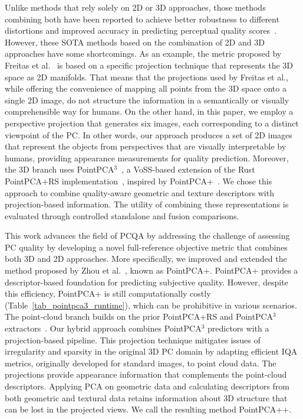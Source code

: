 \documentclass[final,3p,times,twocolumn]{elsarticle}
\begin{document}
Unlike methods that rely solely on 2D or \gls{3D} approaches, those methods combining both have been reported to achieve better robustness to different distortions and improved accuracy in predicting perceptual quality scores~\cite{Javaheri2022joint, freitas2023point, Cui2024Colored}. However, these \gls{SOTA} methods based on the combination of 2D and \gls{3D} approaches have some shortcomings. As an example, the metric proposed by Freitas et al.~\cite{freitas2023point} is based on a specific projection technique that represents the \gls{3D} space as 2D manifolds. That means that the projections used by Freitas et al., while offering the convenience of mapping all points from the \gls{3D} space onto a single 2D image, do not structure the information in a semantically or visually comprehensible way for humans. On the other hand, in this paper, we employ a perspective projection that generates six images, each corresponding to a distinct viewpoint of the \gls{PC}. In other words, our approach produces a set of 2D images that represent the objects from perspectives that are visually interpretable by humans, providing appearance measurements for quality prediction. Moreover, the \gls{3D} branch uses PointPCA$^3$~\cite{carvalho2026pc3}, a \gls{VoSS}-based extension of the Rust PointPCA+RS implementation~\cite{carvalho2025rs}, inspired by PointPCA+~\cite{zhou2025pointpca+}.  We chose this approach to combine quality-aware geometric and texture descriptors with projection-based information. The utility of combining these representations is evaluated through controlled standalone and fusion comparisons.

This work advances the field of \gls{PCQA} by addressing the challenge of assessing \gls{PC} quality by developing a novel full-reference objective metric that combines both \gls{3D} and 2D approaches. More specifically, we improved and extended the method proposed by Zhou et al.~\cite{zhou2023pointpca+, zhou2025pointpca+}, known as PointPCA+. PointPCA+ provides a descriptor-based foundation for predicting subjective quality. However, despite this efficiency, PointPCA+ is still computationally costly (Table~\ref{tab_pointpca3_runtime}), which can be prohibitive in various scenarios. The point-cloud branch builds on the prior PointPCA+RS and PointPCA$^3$ extractors~\cite{carvalho2025rs,carvalho2026pc3}. Our hybrid approach combines PointPCA$^3$ predictors with a projection-based pipeline. This projection technique mitigates issues of irregularity and sparsity in the original \gls{3D} \gls{PC} domain by adapting efficient \gls{IQA} metrics, originally developed for standard images, to point cloud data. The projections provide appearance information that complements the point-cloud descriptors. Applying \gls{PCA} on geometric data and calculating descriptors from both geometric and textural data retains information about \gls{3D} structure that can be lost in the projected views. We call the resulting method PointPCA++.
\end{document}
